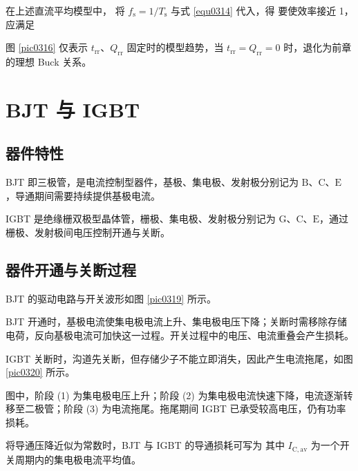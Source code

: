 

在上述直流平均模型中，
将 $f_{\mathrm{s}}=1/T_{\mathrm{s}}$ 与式 \eqref{equ0314} 代入，得
要使效率接近 1，应满足


图 \ref{pic0316} 仅表示 $t_{\mathrm{rr}}$、$Q_{\mathrm{rr}}$ 固定时的模型趋势，当 $t_{\mathrm{rr}}=Q_{\mathrm{rr}}=0$ 时，退化为前章的理想 Buck 关系。

\newpage{}

\section{BJT 与 IGBT}

\subsection{器件特性}

BJT 即三极管，是电流控制型器件，基极、集电极、发射极分别记为 $\mathrm B$、$\mathrm C$、$\mathrm E$ ，导通期间需要持续提供基极电流。


IGBT 是绝缘栅双极型晶体管，栅极、集电极、发射极分别记为 $\mathrm G$、$\mathrm C$、$\mathrm E$，通过栅极、发射极间电压控制开通与关断。


\subsection{器件开通与关断过程}

BJT 的驱动电路与开关波形如图 \ref{pic0319} 所示。


BJT 开通时，基极电流使集电极电流上升、集电极电压下降；关断时需移除存储电荷，反向基极电流可加快这一过程。开关过程中的电压、电流重叠会产生损耗。

IGBT 关断时，沟道先关断，但存储少子不能立即消失，因此产生电流拖尾，如图 \ref{pic0320} 所示。


图中，阶段 (1) 为集电极电压上升；阶段 (2) 为集电极电流快速下降，电流逐渐转移至二极管；阶段 (3) 为电流拖尾。拖尾期间 IGBT 已承受较高电压，仍有功率损耗。

将导通压降近似为常数时，BJT 与 IGBT 的导通损耗可写为
其中 $I_{\mathrm{C,av}}$ 为一个开关周期内的集电极电流平均值。

